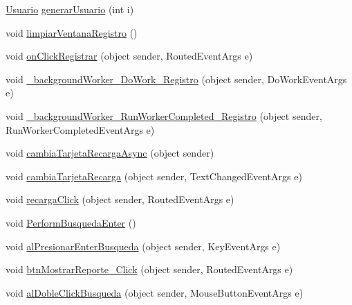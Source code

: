 \begin{DoxyCompactItemize}
\item 
\hyperlink{class_proyecto___integrador__3_1_1_tipos_dato_1_1_usuario}{Usuario} \hyperlink{class_proyecto___integrador__3_1_1_main_window_a7361600e3b7132956ef979fea3dc1b3d}{generar\-Usuario} (int i)
\item 
void \hyperlink{class_proyecto___integrador__3_1_1_main_window_a1d010d4a4b67fd7ffd813ca7112a36c0}{limpiar\-Ventana\-Registro} ()
\item 
void \hyperlink{class_proyecto___integrador__3_1_1_main_window_a39bbc99ea9b8992b13d0fca168a7c114}{on\-Click\-Registrar} (object sender, Routed\-Event\-Args e)
\item 
void \hyperlink{class_proyecto___integrador__3_1_1_main_window_aae749b1f7feed30900718b882825b55b}{\-\_\-background\-Worker\-\_\-\-Do\-Work\-\_\-\-Registro} (object sender, Do\-Work\-Event\-Args e)
\item 
void \hyperlink{class_proyecto___integrador__3_1_1_main_window_a4fe8d1cf799e1d4280c5abcc9eb9d356}{\-\_\-background\-Worker\-\_\-\-Run\-Worker\-Completed\-\_\-\-Registro} (object sender, Run\-Worker\-Completed\-Event\-Args e)
\item 
void \hyperlink{class_proyecto___integrador__3_1_1_main_window_a13c290aea55aad3e4de241ed928a4dfc}{cambia\-Tarjeta\-Recarga\-Async} (object sender)
\item 
void \hyperlink{class_proyecto___integrador__3_1_1_main_window_ae62fbb5bc9da0f805d207465ef0ac41a}{cambia\-Tarjeta\-Recarga} (object sender, Text\-Changed\-Event\-Args e)
\item 
void \hyperlink{class_proyecto___integrador__3_1_1_main_window_a68df3d7dfa33cf79e6c178960b20c096}{recarga\-Click} (object sender, Routed\-Event\-Args e)
\item 
void \hyperlink{class_proyecto___integrador__3_1_1_main_window_a871df14819bade692bdb4afb14fc9c45}{Perform\-Busqueda\-Enter} ()
\item 
void \hyperlink{class_proyecto___integrador__3_1_1_main_window_add266d3adbe6dc3acb7eddcbcbacf80e}{al\-Presionar\-Enter\-Busqueda} (object sender, Key\-Event\-Args e)
\item 
void \hyperlink{class_proyecto___integrador__3_1_1_main_window_a186922fb90de5a2382e57e431415a09e}{btn\-Mostrar\-Reporte\-\_\-\-Click} (object sender, Routed\-Event\-Args e)
\item 
void \hyperlink{class_proyecto___integrador__3_1_1_main_window_a45bf387a5341eeedd23517408ad9a4c0}{al\-Doble\-Click\-Busqueda} (object sender, Mouse\-Button\-Event\-Args e)
\item 

\end{DoxyCompactItemize}
